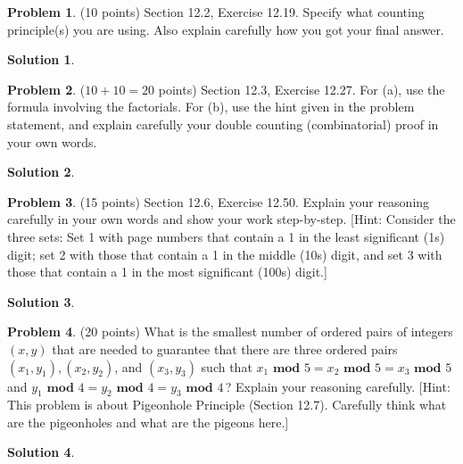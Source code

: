 \documentclass{article}
\theoremstyle{definition}
\newtheorem{problem}{Problem}
\newtheorem*{solution}{Solution}
\begin{document}
\newpage
\begin{problem} (10 points) Section 12.2, Exercise 12.19.  Specify what counting principle(s)
you are using.  Also explain carefully how you got your final answer.
\end{problem}
\begin{solution}
\end{solution}

\newpage
\begin{problem} ($10+10=20$ points) Section 12.3, Exercise 12.27.
For (a), use the formula involving the factorials.  For (b), use the hint given in the
problem statement, and explain carefully your double counting (combinatorial) 
proof in your own words.
\end{problem}
\begin{solution} 
\end{solution}

\newpage
\begin{problem} (15 points) Section 12.6, Exercise 12.50.  Explain your reasoning
carefully in your own words and show your work step-by-step.
[Hint: Consider the three sets: Set 1 with page numbers that contain a 1 in the least 
significant (1s) digit; set 2 with those that contain a 1 in the middle (10s) digit, and 
set 3 with those that contain a 1 in the most significant (100s) digit.]
\end{problem}
\begin{solution} 
\end{solution}

\newpage
\begin{problem} (20 points) What is the smallest number of ordered pairs of integers 
$(x, y)$ that are needed to guarantee that there are three ordered pairs 
$(x_1, y_1), (x_2, y_2)$, and $(x_3, y_3)$ such that
$x_1\textbf{ mod } 5 = x_2 \textbf{ mod } 5 = x_3 \textbf{ mod } 5$ and 
$y_1 \textbf{ mod } 4 = y_2 \textbf{ mod } 4 = y_3 \textbf{ mod } 4$\,?
Explain your reasoning carefully.
[Hint: This problem is about Pigeonhole Principle (Section 12.7). 
Carefully think what are the pigeonholes and what are the pigeons here.]
\end{problem}
\begin{solution} 
\end{solution}
\end{document}
